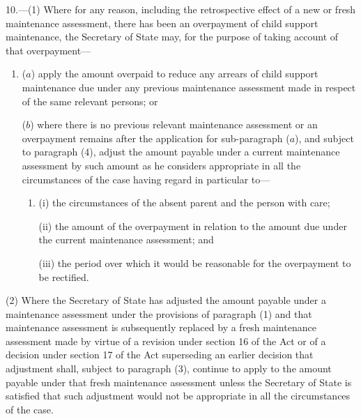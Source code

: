 \documentclass[12pt,a4paper]{article}
\begin{document}
10.—(1) Where for any reason, including the retrospective effect of a new or fresh maintenance assessment, there has been an overpayment of child support maintenance, 
the Secretary of State  %
may, for the purpose of taking account of that overpayment—
\begin{enumerate}\item[]
($a$) apply the amount overpaid to reduce any arrears of child support maintenance due under any previous maintenance assessment made in respect of the same relevant persons; or

($b$) where there is no previous relevant maintenance assessment or an overpayment remains after the application for sub-paragraph ($a$), and subject to paragraph (4), adjust the amount payable under a current maintenance assessment by such amount as he considers appropriate in all the circumstances of the case having regard in particular to—
\begin{enumerate}\item[]
(i) the circumstances of the absent parent and the person with care;

\begin{sloppypar}
(ii) the amount of the overpayment in relation to the amount due under the current maintenance assessment; and
\end{sloppypar}

(iii) the period over which it would be reasonable for the overpayment to be rectified.
\end{enumerate}
\end{enumerate}

(2) Where 
the Secretary of State  %
has adjusted the amount payable under a maintenance assessment under the provisions of paragraph (1) and that maintenance assessment is subsequently 
replaced by a fresh maintenance assessment made by virtue of a revision under section 16 of the Act or of a decision under section 17 of the Act superseding an earlier decision  %
that adjustment shall, subject to paragraph (3), continue to apply to the amount payable under that fresh maintenance assessment unless 
the Secretary of State  %
is satisfied that such adjustment would not be appropriate in all the circumstances of the case.
\end{document}
